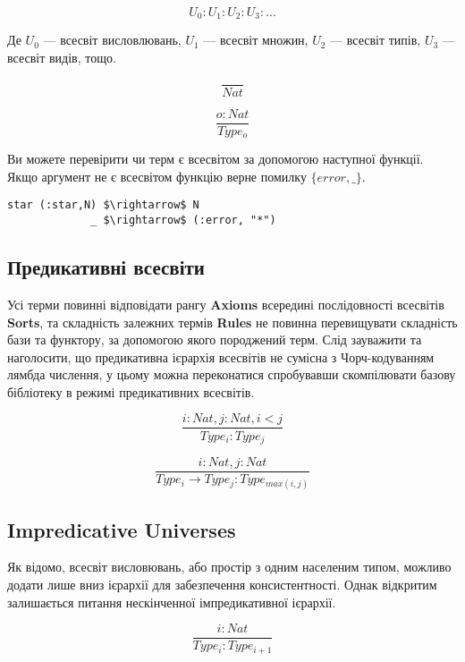 \documentclass{article}
\begin{document}
$$
U_0 : U_1 : U_2 : U_3 : ...
$$

Де $U_0$ --- всесвіт висловлювань, $U_1$ --- всесвіт множин, $U_2$ --- всесвіт типів, $U_3$ --- всесвіт видів, тощо.

\begin{equation}
\tag{I}
\dfrac
{}
{Nat}
\end{equation}

\begin{equation}
\tag{S}
\dfrac
{o : Nat}
{Type_o}
\end{equation}

Ви можете перевірити чи терм є всесвітом за допомогою наступної функції. Якщо аргумент не є всесвітом функцію верне помилку  $\{error,\_\}$.

\begin{lstlisting}[mathescape=true]
star (:star,N) $\rightarrow$ N
             _ $\rightarrow$ (:error, "*")
\end{lstlisting}

\subsection{Предикативні всесвіти}

Усі терми повинні відповідати рангу {\bf Axioms} всередині послідовності всесвітів {\bf Sorts}, та складність залежних
термів {\bf Rules} не повинна перевищувати складність бази та функтору, за допомогою якого породжений терм.
Слід зауважити та наголосити, що предикативна ієрархія всесвітів не сумісна з Чорч-кодуванням лямбда числення, у цьому можна
переконатися спробувавши скомпілювати базову бібліотеку в режимі предикативних всесвітів.

\[
\tag{$A_1$}
\dfrac{i: Nat, j: Nat, i < j}{Type_i : Type_j}
\]

\[
\tag{$R_1$}
\dfrac{i : Nat, j : Nat}{Type_i \rightarrow Type_j : Type_{max(i,j)} }
\]

\subsection{Impredicative Universes}

Як відомо, всесвіт висловювань, або простір з одним населеним типом, можливо додати лише вниз ієрархії для забезпечення консистентності.
Однак відкритим залишається питання нескінченної імпредикативної ієрархії.

\begin{equation}
\tag{$A_2$}
\dfrac
{i: Nat}
{Type_i : Type_{i+1}}
\end{equation}
\end{document}
